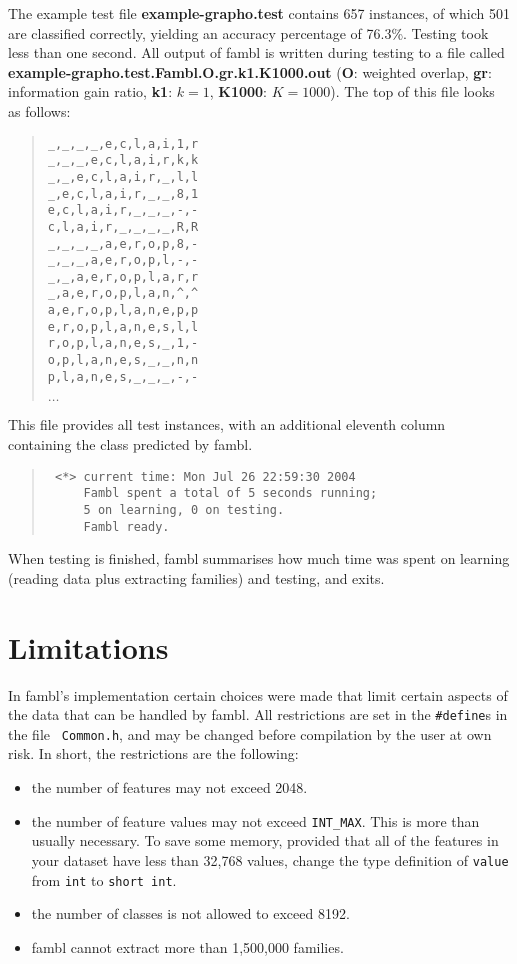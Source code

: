 \documentclass[11pt]{article}
\begin{document}
The example test file {\bf example-grapho.test} contains 657
instances, of which 501 are classified correctly, yielding an accuracy
percentage of 76.3\%. Testing took less than one second. All output of
{\sc fambl} is written during testing to a file called {\bf
  example-grapho.test.Fambl.O.gr.k1.K1000.out} ({\bf O}: weighted
overlap, {\bf gr}: information gain ratio, {\bf k1}: $k=1$, {\bf
  K1000}: $K=1000$). The top of this file looks as follows:

\begin{quote}
{\tiny
\begin{verbatim}
_,_,_,_,e,c,l,a,i,1,r
_,_,_,e,c,l,a,i,r,k,k
_,_,e,c,l,a,i,r,_,l,l
_,e,c,l,a,i,r,_,_,8,1
e,c,l,a,i,r,_,_,_,-,-
c,l,a,i,r,_,_,_,_,R,R
_,_,_,_,a,e,r,o,p,8,-
_,_,_,a,e,r,o,p,l,-,-
_,_,a,e,r,o,p,l,a,r,r
_,a,e,r,o,p,l,a,n,^,^
a,e,r,o,p,l,a,n,e,p,p
e,r,o,p,l,a,n,e,s,l,l
r,o,p,l,a,n,e,s,_,1,-
o,p,l,a,n,e,s,_,_,n,n
p,l,a,n,e,s,_,_,_,-,-
\end{verbatim}
$\ldots$
}
\end{quote}

This file provides all test instances, with an additional eleventh
column containing the class predicted by {\sc fambl}.

\begin{quote}
{\tiny
\begin{verbatim}
 <*> current time: Mon Jul 26 22:59:30 2004
     Fambl spent a total of 5 seconds running;
     5 on learning, 0 on testing.
     Fambl ready.
\end{verbatim}
}
\end{quote}

When testing is finished, {\sc fambl} summarises how much time was
spent on learning (reading data plus extracting families) and testing,
and exits.

\section{Limitations}
\label{notes}

In {\sc fambl}'s implementation certain choices were made that limit
certain aspects of the data that can be handled by {\sc fambl}. All
restrictions are set in the {\tt \#define}s in the file {\tt
Common.h}, and may be changed before compilation by the user at own
risk. In short, the restrictions are the following:

\begin{itemize}
\item
the number of features may not exceed 2048.
\item
the number of feature values may not exceed {\tt INT\_MAX}. This is
more than usually necessary. To save some memory, provided that all of
the features in your dataset have less than 32,768 values, change the
type definition of {\tt value} from {\tt int} to {\tt short int}.
\item
the number of classes is not allowed to exceed 8192.
\item
{\sc fambl} cannot extract more than 1,500,000 families.
\end{itemize}
\end{document}
